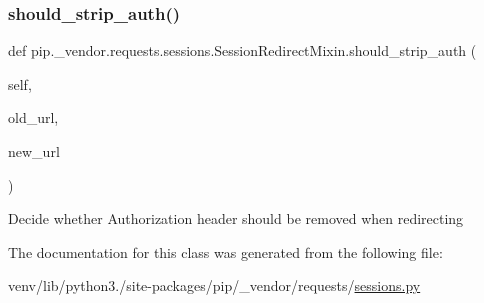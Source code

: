 \subsubsection{\texorpdfstring{should\+\_\+strip\+\_\+auth()}{should\_strip\_auth()}}
{\footnotesize\ttfamily def pip.\+\_\+vendor.\+requests.\+sessions.\+Session\+Redirect\+Mixin.\+should\+\_\+strip\+\_\+auth (\begin{DoxyParamCaption}\item[{}]{self,  }\item[{}]{old\+\_\+url,  }\item[{}]{new\+\_\+url }\end{DoxyParamCaption})}

\begin{DoxyVerb}Decide whether Authorization header should be removed when redirecting\end{DoxyVerb}
 

The documentation for this class was generated from the following file\+:\begin{DoxyCompactItemize}
\item 
venv/lib/python3./site-\/packages/pip/\+\_\+vendor/requests/\hyperlink{sessions_8py}{sessions.\+py}\end{DoxyCompactItemize}
